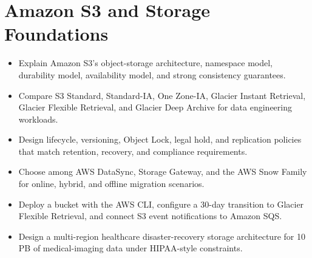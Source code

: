 \chapter{Amazon S3 and Storage Foundations}
%
%
\begin{objectives}
\begin{itemize}
    \item Explain Amazon S3's object-storage architecture, namespace model, durability model, availability model, and strong consistency guarantees.
    \item Compare S3 Standard, Standard-IA, One Zone-IA, Glacier Instant Retrieval, Glacier Flexible Retrieval, and Glacier Deep Archive for data engineering workloads.
    \item Design lifecycle, versioning, Object Lock, legal hold, and replication policies that match retention, recovery, and compliance requirements.
    \item Choose among AWS DataSync, Storage Gateway, and the AWS Snow Family for online, hybrid, and offline migration scenarios.
    \item Deploy a bucket with the AWS CLI, configure a 30-day transition to Glacier Flexible Retrieval, and connect S3 event notifications to Amazon SQS.
    \item Design a multi-region healthcare disaster-recovery storage architecture for 10 PB of medical-imaging data under HIPAA-style constraints.
\end{itemize}
\end{objectives}

